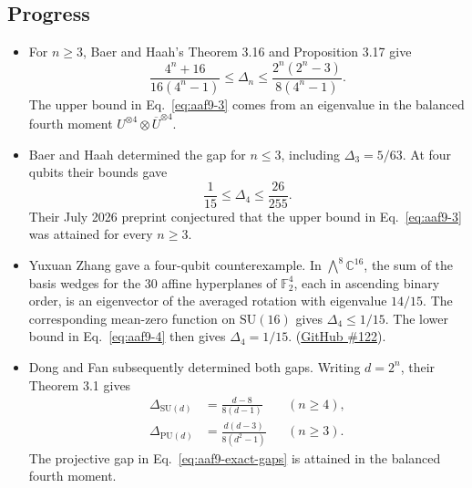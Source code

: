 \subsection*{Progress}

\begin{itemize}
  \item For $n\geq3$, Baer and Haah's Theorem 3.16 and Proposition 3.17 give
  \begin{equation}
    \frac{4^n+16}{16(4^n-1)}\leq\Delta_n\leq\frac{2^n(2^n-3)}{8(4^n-1)}.
    \label{eq:aaf9-3}
  \end{equation}
  The upper bound in Eq.~\eqref{eq:aaf9-3} comes from an eigenvalue in the balanced fourth moment $U^{\otimes4}\otimes\overline U^{\otimes4}$. 

  \item Baer and Haah determined the gap for $n\leq3$, including $\Delta_3=5/63$. At four qubits their bounds gave
  \begin{equation}
    \frac{1}{15}\leq\Delta_4\leq\frac{26}{255}.
    \label{eq:aaf9-4}
  \end{equation}
  Their July 2026 preprint conjectured that the upper bound in Eq.~\eqref{eq:aaf9-3} was attained for every $n\geq3$. 

  \item Yuxuan Zhang gave a four-qubit counterexample. In $\bigwedge^8\mathbb C^{16}$, the sum of the basis wedges for the $30$ affine hyperplanes of $\mathbb F_2^4$, each in ascending binary order, is an eigenvector of the averaged rotation with eigenvalue $14/15$. The corresponding mean-zero function on $\mathrm{SU}(16)$ gives $\Delta_4\leq1/15$. The lower bound in Eq.~\eqref{eq:aaf9-4} then gives $\Delta_4=1/15$.  (\href{https://github.com/Naixu-Guo/quantum-open-problems/issues/122}{GitHub \#122}).

  \item Dong and Fan subsequently determined both gaps. Writing $d=2^n$, their Theorem 3.1 gives
  \begin{equation}
    \begin{aligned}
      \Delta_{\mathrm{SU}(d)} &= \frac{d-8}{8(d-1)} && (n\geq4),\\
      \Delta_{\mathrm{PU}(d)} &= \frac{d(d-3)}{8(d^2-1)} && (n\geq3).
    \end{aligned}
    \label{eq:aaf9-exact-gaps}
  \end{equation}
  The projective gap in Eq.~\eqref{eq:aaf9-exact-gaps} is attained in the balanced fourth moment. 
\end{itemize}

